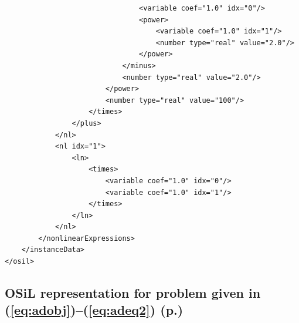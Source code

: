 \documentclass[11pt]{article}
\renewcommand{\_}{{\char"5F}}
\renewcommand{\{}{{\char"7B}}
\renewcommand{\}}{{\char"7D}}
\renewcommand{\^}{{\char"0D}}
\renewcommand{\'}{{\char"0D}}
\begin{document}
\begin{enumerate}[Step 1:]
{\begin{verbatim}
                                <variable coef="1.0" idx="0"/>
                                <power>
                                    <variable coef="1.0" idx="1"/>
                                    <number type="real" value="2.0"/>
                                </power>
                            </minus>
                            <number type="real" value="2.0"/>
                        </power>
                        <number type="real" value="100"/>
                    </times>
                </plus>
            </nl>
            <nl idx="1">
                <ln>
                    <times>
                        <variable coef="1.0" idx="0"/>
                        <variable coef="1.0" idx="1"/>
                    </times>
                </ln>
            </nl>
        </nonlinearExpressions>
    </instanceData>
</osil>
\end{verbatim}

}%


\subsection{OSiL representation for problem given in (\ref{eq:adobj})--(\ref{eq:adeq2}) (p.\pageref{eq:adobj})
}\label{section:adexample}


\end{enumerate}
\end{document}

